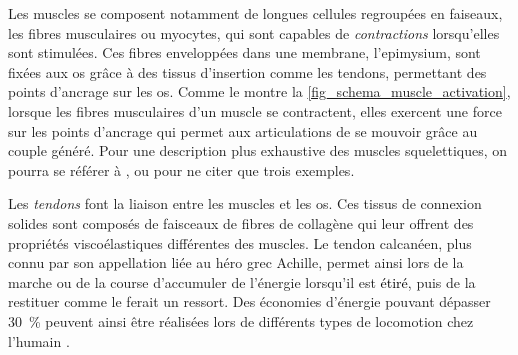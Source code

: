 Les muscles se composent notamment de longues cellules regroupées en faiseaux, les fibres musculaires ou myocytes, qui sont capables de \emph{contractions} lorsqu'elles sont stimulées. Ces fibres enveloppées dans une membrane, l'epimysium, sont fixées aux os grâce à des tissus d'insertion comme les tendons, permettant des points d'ancrage sur les os. Comme le montre la \cref{fig_schema_muscle_activation}, lorsque les fibres musculaires d'un muscle se contractent, elles exercent une force sur les points d'ancrage qui permet aux articulations de se mouvoir grâce au couple généré. Pour une description plus exhaustive des muscles squelettiques, on pourra se référer à \textcite[Chapitre~1]{mcmahon_muscles_1984}, \textcite[Chapitre~2]{tresilian_sensorimotor_2013} ou \textcite{nishikawa_neuromechanics_2007} pour ne citer que trois exemples.



Les \emph{tendons} font la liaison entre les muscles et les os. Ces tissus de connexion solides sont composés de faisceaux de fibres de collagène qui leur offrent des propriétés viscoélastiques différentes des muscles. Le tendon calcanéen, plus connu par son appellation liée au héro grec Achille, permet ainsi lors de la marche ou de la course d'accumuler de l'énergie lorsqu'il est \textcolor{black}{étiré}, puis de la restituer comme le ferait un ressort. Des économies d'énergie pouvant dépasser \SI{30}{\percent} peuvent ainsi être réalisées lors de différents types de locomotion chez l'humain \parencite{ker_spring_1987, alexander_energy-saving_1991, bramble_endurance_2004}.

